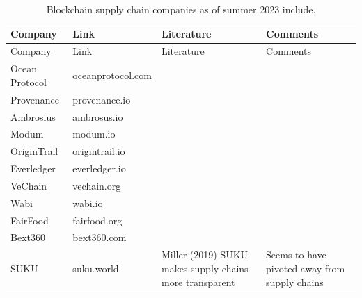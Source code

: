 \documentclass[
  letterpaper,
  DIV=11,
  numbers=noendperiod]{scrartcl}
\begin{document}
\begin{longtable}[]{@{}
  >{\raggedright\arraybackslash}p{}
  >{\raggedright\arraybackslash}p{}
  >{\raggedright\arraybackslash}p{}
  >{\raggedright\arraybackslash}p{}@{}}
\caption{Blockchain supply chain companies as of summer 2023
include.}\tabularnewline
\toprule\noalign{}
\begin{minipage}[b]{\linewidth}\raggedright
Company
\end{minipage} & \begin{minipage}[b]{\linewidth}\raggedright
Link
\end{minipage} & \begin{minipage}[b]{\linewidth}\raggedright
Literature
\end{minipage} & \begin{minipage}[b]{\linewidth}\raggedright
Comments
\end{minipage} \\
\midrule\noalign{}
\endfirsthead
\toprule\noalign{}
\begin{minipage}[b]{\linewidth}\raggedright
Company
\end{minipage} & \begin{minipage}[b]{\linewidth}\raggedright
Link
\end{minipage} & \begin{minipage}[b]{\linewidth}\raggedright
Literature
\end{minipage} & \begin{minipage}[b]{\linewidth}\raggedright
Comments
\end{minipage} \\
\midrule\noalign{}
\endhead
\bottomrule\noalign{}
\endlastfoot
Ocean Protocol & oceanprotocol.com & & \\
Provenance & provenance.io & & \\
Ambrosius & ambrosus.io & & \\
Modum & modum.io & & \\
OriginTrail & origintrail.io & & \\
Everledger & everledger.io & & \\
VeChain & vechain.org & & \\
Wabi & wabi.io & & \\
FairFood & fairfood.org & & \\
Bext360 & bext360.com & & \\
SUKU & suku.world & Miller (2019) SUKU makes supply chains more
transparent & Seems to have pivoted away from supply chains \\
\end{longtable}
\end{document}

